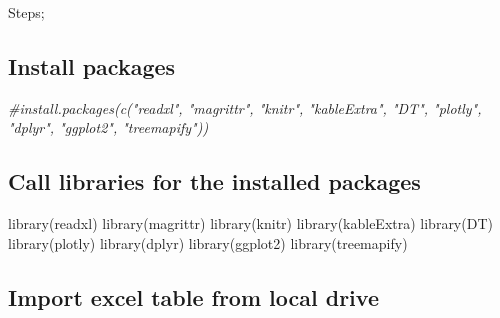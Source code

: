 \documentclass[
]{book}
\newenvironment{Shaded}{\begin{snugshade}}{\end{snugshade}}
\newcommand{\CommentTok}[1]{\textcolor[rgb]{0.56,0.35,0.01}{\textit{#1}}}
\newcommand{\FunctionTok}[1]{\textcolor[rgb]{0.00,0.00,0.00}{#1}}
\newcommand{\NormalTok}[1]{#1}
\begin{document}
Steps;

\hypertarget{install-packages}{%
\subsection{Install packages}\label{install-packages}}

\begin{Shaded}
\begin{Highlighting}[]
\CommentTok{\#install.packages(c("readxl", "magrittr", "knitr", "kableExtra", "DT", "plotly", "dplyr", "ggplot2", "treemapify"))}
\end{Highlighting}
\end{Shaded}

\hypertarget{call-libraries-for-the-installed-packages}{%
\subsection{Call libraries for the installed packages}\label{call-libraries-for-the-installed-packages}}

\begin{Shaded}
\begin{Highlighting}[]
\FunctionTok{library}\NormalTok{(readxl)}
\FunctionTok{library}\NormalTok{(magrittr)}
\FunctionTok{library}\NormalTok{(knitr)}
\FunctionTok{library}\NormalTok{(kableExtra)}
\FunctionTok{library}\NormalTok{(DT)}
\FunctionTok{library}\NormalTok{(plotly)}
\FunctionTok{library}\NormalTok{(dplyr)}
\FunctionTok{library}\NormalTok{(ggplot2)}
\FunctionTok{library}\NormalTok{(treemapify)}
\end{Highlighting}
\end{Shaded}

\hypertarget{import-excel-table-from-local-drive}{%
\subsection{Import excel table from local drive}\label{import-excel-table-from-local-drive}}
\end{document}
